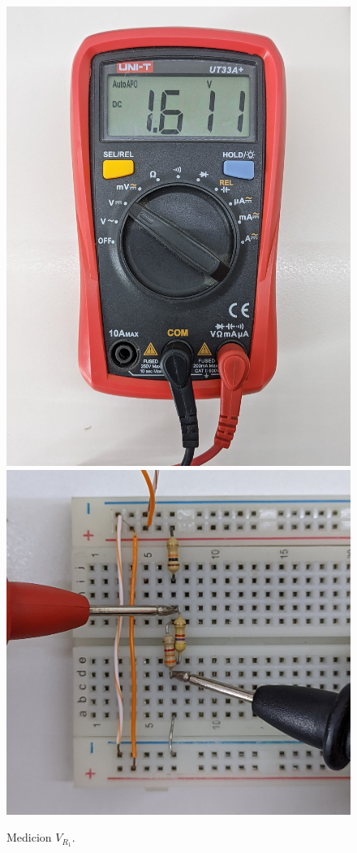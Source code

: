 \documentclass[a4paper,12pt, spanish]{report}
\begin{document}
\begin{figure}[H]
\begin{minipage}{0.3\textwidth}
            \caption{Medicion $V_{R_1}$.}
          \end{minipage}
          \begin{minipage}{0.3\textwidth}
            \centering
            \includegraphics[width=1\linewidth]{pictures/mult-v_r2-r3.jpg}
            \includegraphics[width=1\linewidth]{pictures/prot-v_r2-r3.jpg}

\end{minipage}
\end{figure}
\end{document}
